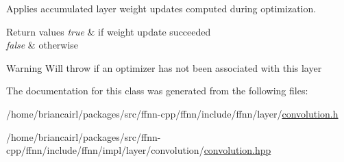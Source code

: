 Applies accumulated layer weight updates computed during optimization. 


\begin{DoxyRetVals}{Return values}
{\em true} & if weight update succeeded \\
\hline
{\em false} & otherwise \\
\hline
\end{DoxyRetVals}
\begin{DoxyWarning}{Warning}
Will throw if an optimizer has not been associated with this layer 
\end{DoxyWarning}


The documentation for this class was generated from the following files\-:\begin{DoxyCompactItemize}
\item 
/home/briancairl/packages/src/ffnn-\/cpp/ffnn/include/ffnn/layer/\hyperlink{convolution_8h}{convolution.\-h}\item 
/home/briancairl/packages/src/ffnn-\/cpp/ffnn/include/ffnn/impl/layer/convolution/\hyperlink{layer_2convolution_2convolution_8hpp}{convolution.\-hpp}\end{DoxyCompactItemize}
